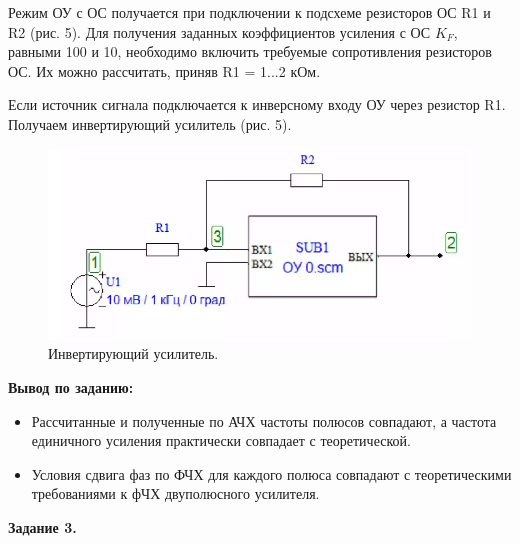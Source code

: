 \documentclass[a4paper,14pt]{extarticle}
\begin{document}
    \vspace{-0,5cm}
    Режим ОУ с ОС получается при подключении к подсхеме резисторов ОС R1 и 
    R2 (рис. 5). Для получения заданных коэффициентов усиления с ОС $K_F$, 
    равными 100 и 10, необходимо включить требуемые сопротивления 
    резисторов ОС. Их можно рассчитать, приняв R1 = 1...2 кОм.

    Если источник сигнала подключается к инверсному входу ОУ через
    резистор R1. Получаем инвертирующий усилитель (рис. 5).

    \begin{figure}[h!]
        \begin{center}
            \includegraphics[scale=0.5]{6.png}
        \end{center}
        \vspace{-1cm}
        \caption{Инвертирующий усилитель.}
    \end{figure}

    \textbf{Вывод по заданию:}

    \begin{itemize}
        \item Рассчитанные и полученные по АЧХ частоты полюсов совпадают, а
              частота единичного усиления практически совпадает с 
              теоретической.
        \item Условия сдвига фаз по ФЧХ для каждого полюса совпадают с 
              теоретическими требованиями к фЧХ двуполюсного усилителя.
    \end{itemize}
    \newpage
    \begin{center}
        \textbf{Задание 3.}
    \end{center}
\end{document}
